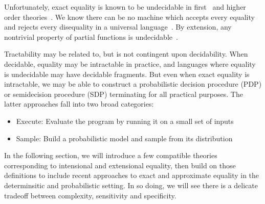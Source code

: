 \documentclass[11pt]{article}
\begin{document}
    Unfortunately, exact equality is known to be undecidable in first~\cite{godel1929vollstandigkeit} and higher order theories~\cite{godel1931formal}. We know there can be no machine which accepts every equality and rejects every disequality in a universal language~\cite{turing1937computable}. By extension, any nontrivial property of partial functions is undecidable~\cite{rice1953classes}. %


    Tractability may be related to, but is not contingent upon decidability. When decidable, equality may be intractable in practice, and languages where equality is undecidable may have decidable fragments. But even when exact equality is intractable, we may be able to construct a probabilistic decision procedure (PDP) or semidecision procedure (SDP) terminating for all practical purposes. The latter approaches fall into two broad categories:

    \begin{itemize}
        \item Execute: Evaluate the program by running it on a small set of inputs
        \item Sample: Build a probabilistic model and sample from its distribution
    \end{itemize}

    In the following section, we will introduce a few compatible theories corresponding to intensional and extensional equality, then build on those definitions to include recent approaches to exact and approximate equality in the determinsitic and probabilistic setting. In so doing, we will see there is a delicate tradeoff between complexity, sensitivity and specificity.

%
\end{document}

